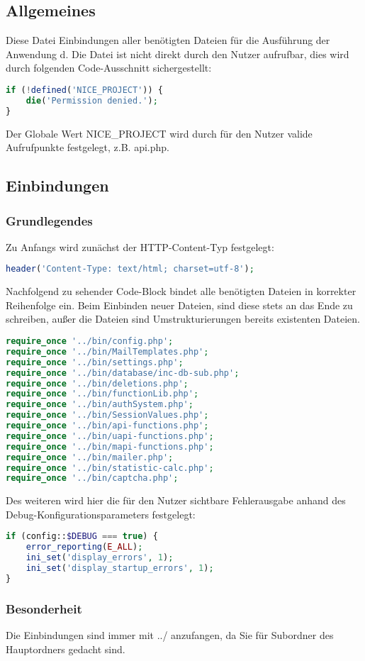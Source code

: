 \subsection{Allgemeines} Diese Datei Einbindungen aller benötigten Dateien für die Ausführung der Anwendung d.
Die Datei ist nicht direkt durch den Nutzer aufrufbar, dies wird durch folgenden Code-Ausschnitt sichergestellt:
\begin{lstlisting}[language=php]
if (!defined('NICE_PROJECT')) {
	die('Permission denied.');
}
\end{lstlisting}
Der Globale Wert {\glqq NICE\_PROJECT\grqq} wird durch für den Nutzer valide Aufrufpunkte festgelegt, z.B. {\glqq api.php\grqq}.
\newpage
\subsection{Einbindungen}
\subsubsection{Grundlegendes}
Zu Anfangs wird zunächst der HTTP-Content-Typ festgelegt:
\begin{lstlisting}[language=php]
header('Content-Type: text/html; charset=utf-8');
\end{lstlisting}
Nachfolgend zu sehender Code-Block bindet alle benötigten Dateien in korrekter Reihenfolge ein. Beim Einbinden neuer Dateien, sind diese stets an das Ende zu schreiben, außer die Dateien sind Umstrukturierungen bereits existenten Dateien.
\begin{lstlisting}[language=php]
require_once '../bin/config.php';
require_once '../bin/MailTemplates.php';
require_once '../bin/settings.php';
require_once '../bin/database/inc-db-sub.php';
require_once '../bin/deletions.php';
require_once '../bin/functionLib.php';
require_once '../bin/authSystem.php';
require_once '../bin/SessionValues.php';
require_once '../bin/api-functions.php';
require_once '../bin/uapi-functions.php';
require_once '../bin/mapi-functions.php';
require_once '../bin/mailer.php';
require_once '../bin/statistic-calc.php';
require_once '../bin/captcha.php';
\end{lstlisting}
Des weiteren wird hier die für den Nutzer sichtbare Fehlerausgabe anhand des Debug-Konfigurationsparameters festgelegt:
\begin{lstlisting}[language=php]
if (config::$DEBUG === true) {
	error_reporting(E_ALL);
	ini_set('display_errors', 1);
	ini_set('display_startup_errors', 1);
}
\end{lstlisting}
\subsubsection{Besonderheit}
Die Einbindungen sind immer mit {\glqq ../\grqq} anzufangen, da Sie für Subordner des Hauptordners gedacht sind.
